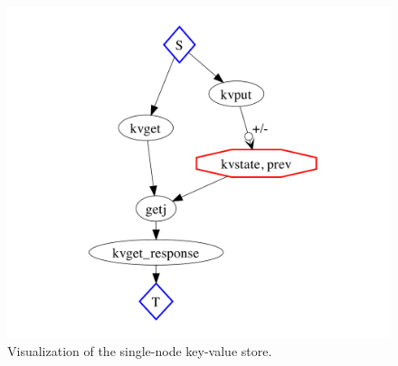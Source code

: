 \begin{figure}[t]
\centering
\includegraphics[width=0.9\linewidth]{fig/basickvs.pdf}
\vspace{-10pt}
\caption{Visualization of the single-node key-value store.}
\label{fig:pdg-kvs-analysis}
\vspace{-2pt}
\end{figure}
